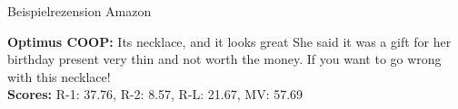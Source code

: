 \begin{frame}{Beispielrezension Amazon}
\begin{Rezension}[!h]
{{        %
        \textbf{Optimus COOP:}  Its \ccolorbox[BackgroundColor]{ \textcolor{HighlightColor}{a beautiful}} \textcolor{HighlightColor}{necklace}\textcolor{HighlightColor}{,} \textcolor{HighlightColor}{and} \textcolor{HighlightColor}{it} looks \textcolor{HighlightColor}{great} \underline{\ccolorbox[BackgroundColor]{ \textcolor{HighlightColor}{for the}} \ccolorbox[BackgroundColor]{ \textcolor{HighlightColor}{price.}}} She said \textcolor{HighlightColor}{it} was \textcolor{HighlightColor}{a} gift \textcolor{HighlightColor}{for} her birthday present\ccolorbox[BackgroundColor]{\textcolor{HighlightColor}{, but}} \ccolorbox[BackgroundColor]{ \textcolor{HighlightColor}{it is}} \textcolor{HighlightColor}{very} \textcolor{HighlightColor}{thin} \textcolor{HighlightColor}{and} not worth \textcolor{HighlightColor}{the} money\textcolor{HighlightColor}{.} If \textcolor{HighlightColor}{you} want \textcolor{HighlightColor}{to} go wrong with \textcolor{HighlightColor}{this} \textcolor{HighlightColor}{necklace}\textcolor{HighlightColor}{!}  \\ 
        \textbf{Scores:} R-1: 37.76, R-2: 8.57, R-L: 21.67, MV: 57.69 }
    
        }

\end{Rezension}
\end{frame}


